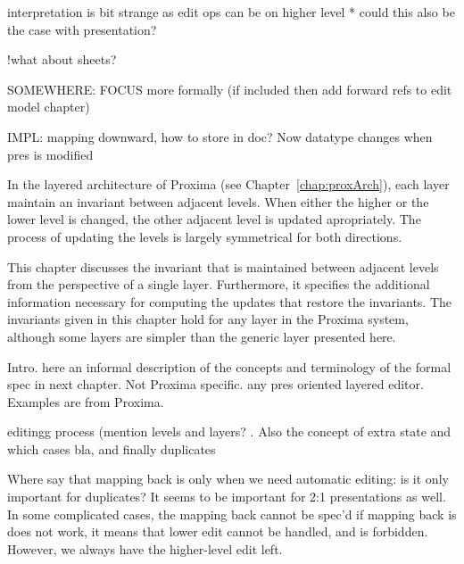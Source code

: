 interpretation is bit strange as edit ops can be on higher level
* could this also be the case with presentation?


!what about sheets? 

SOMEWHERE: FOCUS more formally (if included then add forward refs to edit model chapter)


IMPL: mapping downward, how to store in doc? Now datatype changes when pres is modified

\ec



In the layered architecture of Proxima (see Chapter~\ref{chap:proxArch}), each layer maintain an invariant between adjacent levels. When either the higher or the lower level is changed, the other adjacent level is updated apropriately. The process of updating the levels is largely symmetrical for both directions.

This chapter discusses the invariant that is maintained between adjacent levels from the perspective of a single layer. Furthermore, it specifies the additional information necessary for computing the updates that restore the invariants. The invariants given in this chapter hold for any layer in the Proxima system, although some layers are simpler than the generic layer presented here.



Intro. here an informal description of the concepts and terminology of the formal spec in next chapter. Not Proxima specific. any pres oriented layered editor. Examples are from Proxima.

editingg process (mention levels and layers? .
Also the concept of extra state and which cases  bla, and finally duplicates






\bc
Where say that mapping back is only when we need automatic editing: is it only important for duplicates? It seems to be important for 2:1 presentations as well.  In some complicated cases, the mapping back cannot be spec'd if mapping back is does not work, it means that lower edit cannot be handled, and is forbidden. However, we always have the higher-level edit left.
\ec




